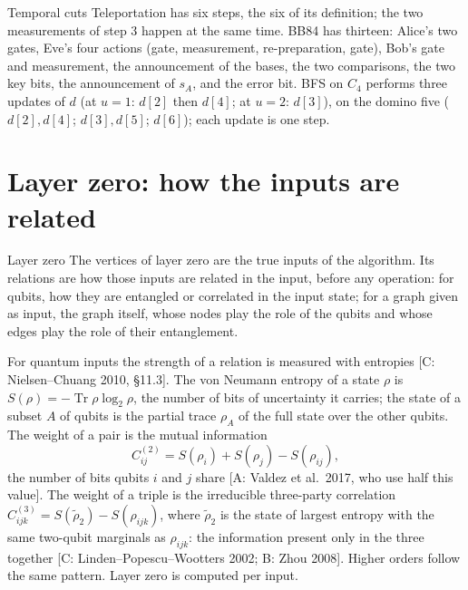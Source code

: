 \documentclass[11pt,a4paper]{article}
\newcommand{\Tr}{\operatorname{Tr}}
\newcommand{\gr}[1]{\textsf{[#1]}}
\begin{document}
\begin{ex}{Temporal cuts}
Teleportation has six steps, the six of its definition; the two measurements of step 3 happen at the same time. BB84 has thirteen: Alice's two gates, Eve's four actions (gate, measurement, re-preparation, gate), Bob's gate and measurement, the announcement of the bases, the two comparisons, the two key bits, the announcement of $s_A$, and the error bit. BFS on $C_4$ performs three updates of $d$ (at $u=1$: $d[2]$ then $d[4]$; at $u=2$: $d[3]$), on the domino five ($d[2],d[4]$; $d[3],d[5]$; $d[6]$); each update is one step.
\end{ex}

\section{Layer zero: how the inputs are related}\label{sec:layer0}

\begin{defn}{Layer zero}
The vertices of layer zero are the true inputs of the algorithm. Its relations are how those inputs are related in the input, before any operation: for qubits, how they are entangled or correlated in the input state; for a graph given as input, the graph itself, whose nodes play the role of the qubits and whose edges play the role of their entanglement.
\end{defn}

For quantum inputs the strength of a relation is measured with entropies \gr{C: Nielsen--Chuang 2010, \S11.3}. The von Neumann entropy of a state $\rho$ is $S(\rho)=-\Tr\rho\log_2\rho$, the number of bits of uncertainty it carries; the state of a subset $A$ of qubits is the partial trace $\rho_A$ of the full state over the other qubits. The weight of a pair is the mutual information
\[ C^{(2)}_{ij}=S(\rho_i)+S(\rho_j)-S(\rho_{ij}), \]
the number of bits qubits $i$ and $j$ share \gr{A: Valdez et al.\ 2017, who use half this value}. The weight of a triple is the irreducible three-party correlation $C^{(3)}_{ijk}=S(\tilde\rho_2)-S(\rho_{ijk})$, where $\tilde\rho_2$ is the state of largest entropy with the same two-qubit marginals as $\rho_{ijk}$: the information present only in the three together \gr{C: Linden--Popescu--Wootters 2002; B: Zhou 2008}. Higher orders follow the same pattern. Layer zero is computed per input.
\end{document}

